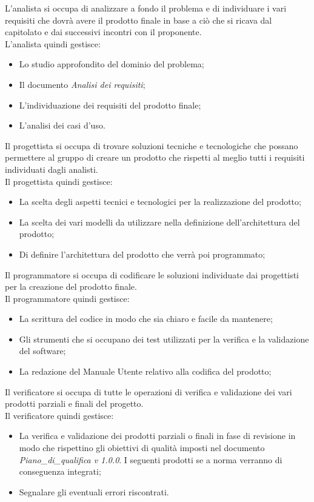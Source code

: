 	L'analista si occupa di analizzare a fondo il problema e di individuare i vari requisiti che dovrà avere il prodotto finale in base a ciò che si ricava dal capitolato e dai successivi incontri con il proponente. \\
	L'analista quindi gestisce:
	\begin{itemize}
		\item Lo studio approfondito del dominio del problema; 
		\item Il documento \textit{Analisi dei requisiti};
		\item L'individuazione dei requisiti del prodotto finale;
		\item L'analisi dei casi d'uso.
	\end{itemize}
	Il progettista si occupa di trovare soluzioni tecniche e tecnologiche che possano permettere al gruppo di creare un prodotto che rispetti al meglio tutti i requisiti individuati dagli analisti. \\
	Il progettista quindi gestisce:
	\begin{itemize}
		\item La scelta degli aspetti tecnici e tecnologici per la realizzazione del prodotto; 
		\item La scelta dei vari modelli da utilizzare nella definizione dell'architettura del prodotto;
		\item Di definire l'architettura del prodotto che verrà poi programmato;
	\end{itemize}
	Il programmatore si occupa di codificare le soluzioni individuate dai progettisti per la creazione del prodotto finale. \\
	Il programmatore quindi gestisce:
	\begin{itemize}
		\item La scrittura del codice in modo che sia chiaro e facile da mantenere; 
		\item Gli strumenti che si occupano dei test utilizzati per la verifica e la validazione del software;
		\item La redazione del Manuale Utente relativo alla codifica del prodotto;
	\end{itemize}
	Il verificatore si occupa di tutte le operazioni di verifica e validazione dei vari prodotti parziali e finali del progetto. \\
	Il verificatore quindi gestisce:
	\begin{itemize}
		\item La verifica e validazione dei prodotti parziali o finali in fase di revisione in modo che rispettino gli obiettivi di qualità imposti nel documento \textit{Piano\_di\_qualifica v 1.0.0}. I seguenti prodotti se a norma verranno di conseguenza integrati; 
		\item Segnalare gli eventuali errori riscontrati.
	\end{itemize}
